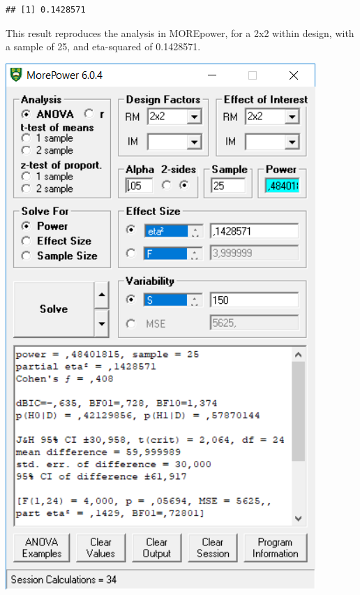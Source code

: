\documentclass[
]{book}
\newenvironment{Shaded}{\begin{snugshade}}{\end{snugshade}}
\newcommand{\DecValTok}[1]{\textcolor[rgb]{0.00,0.00,0.81}{#1}}
\newcommand{\NormalTok}[1]{#1}
\newcommand{\OperatorTok}[1]{\textcolor[rgb]{0.81,0.36,0.00}{\textbf{#1}}}
\begin{document}
\begin{Shaded}
\end{Shaded}

\begin{verbatim}
## [1] 0.1428571
\end{verbatim}

This result reproduces the analysis in MOREpower, for a 2x2 within design, with a sample of 25, and eta-squared of 0.1428571.

\includegraphics{screenshots/morepower_4.png}
\end{document}
